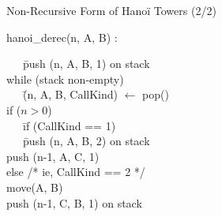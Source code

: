 \newcommand{\etape}[1]{\multicolumn{1}{c}{\structure{Step #1}}}
\begin{frame}{Non-Recursive Form of Hanoï Towers (2/2)}
  \begin{flushright}
  \end{flushright}\vspace{-6\baselineskip}

  \begin{block}{hanoi\_derec(n, A, B) :}\vspace{-.8\baselineskip}
    {\small%
      \begin{tabbing}
        ~~~\=push (n, A, B, 1) on stack\\
        \>while (stack non-empty) \\
        \>~~~\=(n, A, B, CallKind) $\leftarrow$ pop()\\
        \>\>if ($n>0$)\\
        \>\>~~~\=if (CallKind == 1) \\
        \>\>\>~~~\=push (n, A, B, 2) on stack 
                   \\
        \>\>\>\>push (n-1, A, C, 1) 
                   \\
        \>\>\>else /* ie, CallKind == 2 */\\
        \>\>\>\>move(A, B)\\
        \>\>\>\>push (n-1, C, B, 1) on stack\\
      \end{tabbing}
    }
  \end{block}\vspace{-2\baselineskip}


\end{frame}
